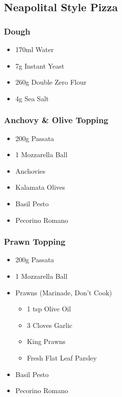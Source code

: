 \documentclass[11pt, english]{article}
\begin{document}
\newpage

	\subsection{Neapolital Style Pizza}

		\subsubsection*{Dough}

	\begin{itemize}
        \setlength\itemsep{0cm}
                \item 170ml Water
		\item 7g Instant Yeast
		\item 260g Double Zero Flour
		\item 4g Sea Salt
        \end{itemize}

		\subsubsection*{Anchovy \& Olive Topping}

	\begin{itemize}
        \setlength\itemsep{0cm}
                \item 200g Passata
		\item 1 Mozzarella Ball
                \item Anchovies
		\item Kalamata Olives
		\item Basil Pesto
		\item Pecorino Romano
        \end{itemize}

		\subsubsection*{Prawn Topping}

	\begin{itemize}
        \setlength\itemsep{0cm}
                \item 200g Passata
		\item 1 Mozzarella Ball
		\item Prawns (Marinade, Don't Cook)
		\begin{itemize}
			\item 1 tsp Olive Oil
                	\item 3 Cloves Garlic
			\item King Prawns
			\item Fresh Flat Leaf Parsley
		\end{itemize}
		\item Basil Pesto
		\item Pecorino Romano
        \end{itemize}
\end{document}
